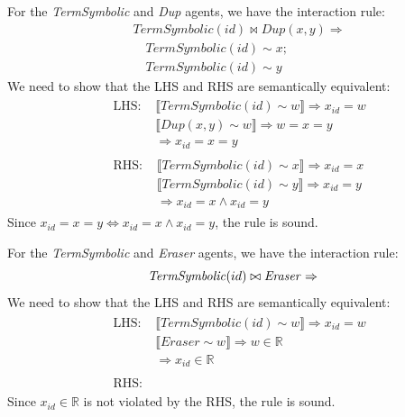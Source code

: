 \begin{lemma}
	For the \textit{TermSymbolic} and \textit{Dup} agents, we have the interaction rule:
	$$
	\begin{aligned}
		& \mathit{TermSymbolic}(id) \bowtie \mathit{Dup}(x, y) \Rightarrow \\
		& \quad \mathit{TermSymbolic}(id) \sim x; \\
		& \quad \mathit{TermSymbolic}(id) \sim y
	\end{aligned}
	$$
	We need to show that the LHS and RHS are semantically equivalent:
	$$
	\begin{aligned}
		& \begin{aligned}
			\text{LHS: } & \llbracket \mathit{TermSymbolic}(id) \sim w \rrbracket \Rightarrow x_{id} = w \\
			& \llbracket \mathit{Dup}(x, y) \sim w \rrbracket \Rightarrow w = x = y \\
			& \Rightarrow x_{id} = x = y
		\end{aligned} \\
		& \begin{aligned}
			\text{RHS: } & \llbracket \mathit{TermSymbolic}(id) \sim x \rrbracket \Rightarrow x_{id} = x \\
			& \llbracket \mathit{TermSymbolic}(id) \sim y \rrbracket \Rightarrow x_{id} = y \\
			& \Rightarrow x_{id} = x \land x_{id} = y
		\end{aligned}
	\end{aligned}
	$$
	Since $x_{id} = x = y \iff x_{id} = x \land x_{id} = y$, the rule is sound.
\end{lemma}

\begin{lemma}
	For the \textit{TermSymbolic} and \textit{Eraser} agents, we have the interaction rule:
	$$
	\mathit{TermSymbolic}(id) \bowtie \mathit{Eraser} \Rightarrow  \\
	$$
	We need to show that the LHS and RHS are semantically equivalent:
	$$
	\begin{aligned}
		& \begin{aligned}
			\text{LHS: } & \llbracket \mathit{TermSymbolic}(id) \sim w \rrbracket \Rightarrow x_{id} = w \\
			& \llbracket \mathit{Eraser} \sim w \rrbracket \Rightarrow w \in \mathbb{R} \\
			& \Rightarrow x_{id} \in \mathbb{R} 
		\end{aligned} \\
		& \begin{aligned}
			\text{RHS: }
		\end{aligned}
	\end{aligned}
	$$
	Since $x_{id} \in \mathbb{R}$ is not violated by the RHS, the rule is sound.
\end{lemma}
